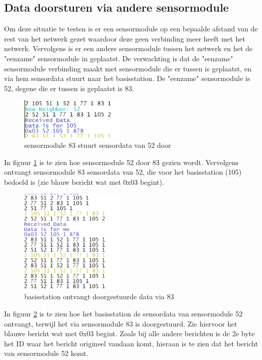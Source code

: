 \documentclass[a4paper, 11pt]{article}
\begin{document}
\subsection{Data doorsturen via andere sensormodule}
Om deze situatie te testen is er een sensormodule op een bepaalde afstand van de rest van het netwerk gezet waardoor deze geen verbinding meer heeft met het netwerk. Vervolgens is er een andere sensormodule tussen het netwerk en het de "eenzame" sensormodule in geplaatst. De verwachting is dat de "eenzame" sensormodule verbinding maakt met sensormodule die er tussen is geplaatst, en via hem sensordata stuurt naar het basisstation. De "eenzame" sensormodule is 52, degene die er tussen is geplaatst is 83.
\newpage
\begin{figure}[h!]
	\centering
	\includegraphics[width=5cm]{TestResults/DataViaBuur/83_StuurtDataDoor.jpeg}
	\caption{sensormodule 83 stuurt sensordata van 52 door} \label{Doorsturen83}
\end{figure}
In figuur \ref{Doorsturen83} is te zien hoe sensormodule 52 door 83 gezien wordt. Vervolgens ontvangt sensormodule 83 sensordata van 52, die voor het basisstation (105) bedoeld is (zie blauw bericht wat met 0x03 begint).
\begin{figure}[h!]
	\centering
	\includegraphics[width=5cm]{TestResults/DataViaBuur/DataRecevied105.png}
	\caption{basisstation ontvangt doorgestuurde data via 83} \label{Doorsturen105}
\end{figure}
In figuur \ref{Doorsturen105} is te zien hoe het basisstation de sensordata van sensormodule 52 ontvangt, terwijl het via sensormodule 83 is doorgestuurd. Zie hiervoor het blauwe bericht wat met 0x03 begint. Zoals bij alle andere berichten is de 2e byte het ID waar het bericht origineel vandaan komt, hieraan is te zien dat het bericht van sensormodule 52 komt. 
\newpage


 
\end{document}
